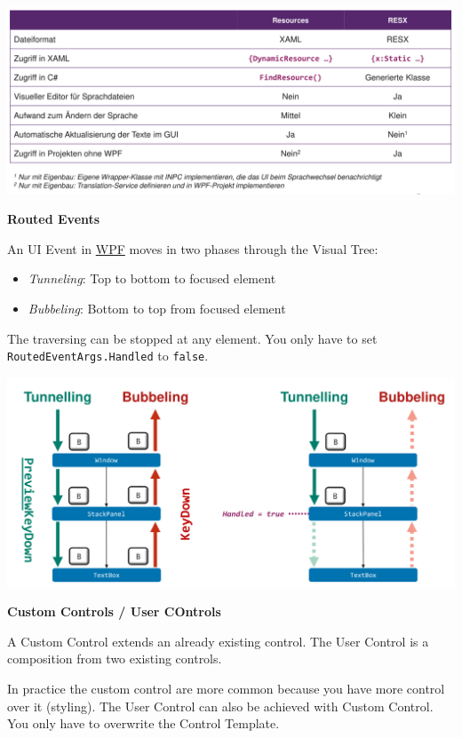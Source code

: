 \documentclass[10pt,twoside,landscape]{article}
\begin{document}
\begin{multicols}{3}
\begin{center}
\includegraphics[width=.9\linewidth]{img/localization_wpf.png}
\end{center}

\textbf{Routed Events}

An UI Event in \href{../../../roam/20211123162923-wpf.org}{WPF} moves in two phases through the Visual Tree:
\begin{itemize}
\item \emph{Tunneling}: Top to bottom to focused element
\item \emph{Bubbeling}: Bottom to top from focused element
\end{itemize}


The traversing can be stopped at any element.
You only have to set \texttt{RoutedEventArgs.Handled} to \texttt{false}.


\begin{center}
\includegraphics[width=.9\linewidth]{img/routed_events.png}
\end{center}


\textbf{Custom Controls / User COntrols}

A Custom Control extends an already existing control.
The User Control is a composition from two existing controls.

In practice the custom control are more common because you have more control over it (styling).
The User Control can also be achieved with Custom Control.
You only have to overwrite the Control Template.



\end{multicols}
\end{document}
